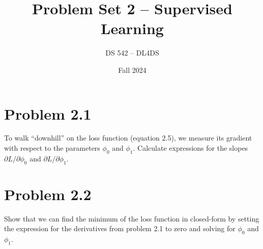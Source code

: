 \documentclass[11pt, oneside]{article}   	%
\title{Problem Set 2 -- Supervised Learning}
\author{DS 542 -- DL4DS}
\date{Fall 2024}							%
\begin{document}
\maketitle
\section*{Problem 2.1}

To walk “downhill” on the loss function (equation 2.5), we measure its gradient
with respect to the parameters \( \phi_0 \) and \( \phi_1 \).
Calculate expressions for the slopes \( \partial L / \partial \phi_0 \)
and \( \partial L / \partial \phi_1 \).

\vspace{5cm}

\section*{Problem 2.2}

Show that we can find the minimum of the loss function in closed-form by setting
the expression for the derivatives from problem 2.1 to zero and solving for
\( \phi_0 \) and \( \phi_1 \).
\end{document}
